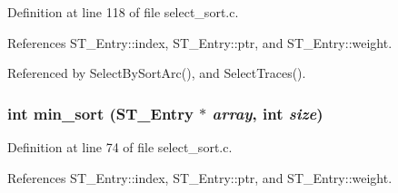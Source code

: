 Definition at line 118 of file select\_\-sort.c.

References ST\_\-Entry::index, ST\_\-Entry::ptr, and ST\_\-Entry::weight.

Referenced by Select\-By\-Sort\-Arc(), and Select\-Traces().
\subsubsection{\setlength{\rightskip}{0pt plus 5cm}int min\_\-sort (\bf{ST\_\-Entry} $\ast$ {\em array}, int {\em size})}\label{select__sort_8c_b2b5f6c6035cc9195207774147881908}




Definition at line 74 of file select\_\-sort.c.

References ST\_\-Entry::index, ST\_\-Entry::ptr, and ST\_\-Entry::weight.